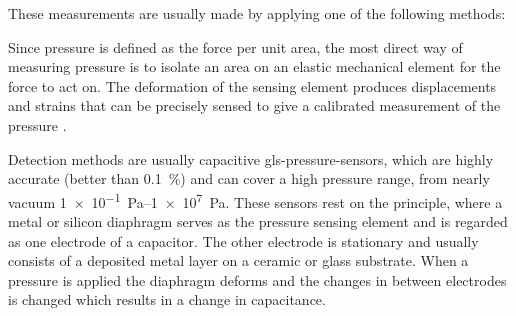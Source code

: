 \noindent These measurements are usually made by applying one of the following methods:

Since pressure is defined as the force per unit area, the most direct way of measuring pressure is to isolate an area on an elastic mechanical element for the force to act on. The deformation of the sensing element produces displacements and strains that can be precisely sensed to give a calibrated measurement of the pressure \cite{webster_measurement_1999}.

Detection methods are usually capacitive \gls{gls-pressure-sensor}s, which are highly accurate (better than \SI{0.1}{\percent}) and can cover a high pressure range, from nearly vacuum \SIrange{1e-1}{1e7}{\pascal}. These sensors rest on the principle, where a metal or silicon diaphragm serves as the pressure sensing element and is regarded as one electrode of a capacitor. The other electrode is stationary and usually consists of a deposited metal layer on a ceramic or glass substrate. When a pressure is applied the diaphragm deforms and the changes in between electrodes is changed which results in a change in capacitance.
%
%
%
%
%
%
